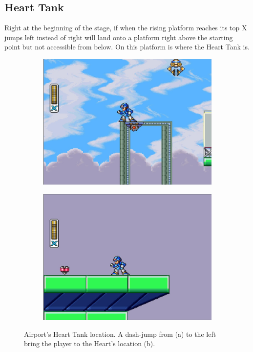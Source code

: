 \subsection{Heart Tank}
Right at the beginning of the stage, if when the rising platform reaches its top X jumps left instead of right will land onto a platform right above the starting point but not accessible from below. On this platform is where the Heart Tank is.
\begin{figure}[h]
	\centering
	\begin{subfigure}{0.4\linewidth}
		\centering
		\includegraphics[width=\linewidth]{figures/X1/Storm_heart_1.jpg}
		\caption{}
	\end{subfigure}
	\begin{subfigure}{0.4\linewidth}
		\centering
		\includegraphics[width=\linewidth]{figures/X1/Storm_heart_2.jpg}
		\caption{}
	\end{subfigure}
	\caption{Airport's Heart Tank location. A dash-jump from (a) to the left bring the player to the Heart's location (b).}
\end{figure}

